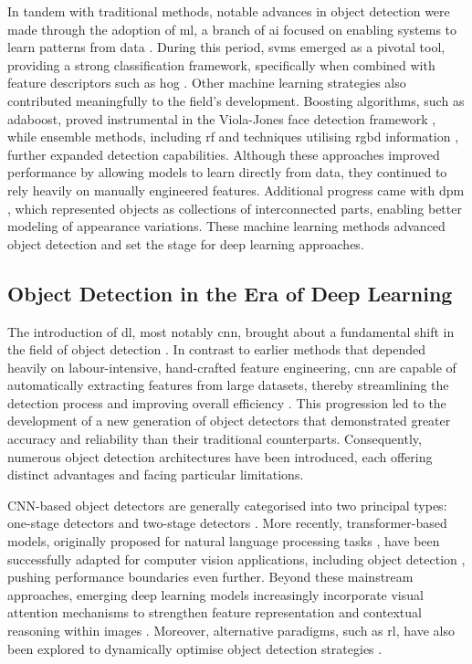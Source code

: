 In tandem with traditional methods, notable advances in object detection were made through the adoption of \gls{ml}, a branch of \gls{ai} focused on enabling systems to learn patterns from data \cite{machine_learning}. During this period, \gls{svms} \cite{hearst1998support} emerged as a pivotal tool, providing a strong classification framework, specifically when combined with feature descriptors such as \gls{hog} \cite{bhatt2023state}. Other machine learning strategies also contributed meaningfully to the field's development. Boosting algorithms, such as \gls{adaboost}, proved instrumental in the Viola-Jones face detection framework \cite{viola2001rapid}, while ensemble methods, including \gls{rf} \cite{saffari2009line} and techniques utilising \gls{rgbd} information \cite{seychell16}, further expanded detection capabilities. Although these approaches improved performance by allowing models to learn directly from data, they continued to rely heavily on manually engineered features. Additional progress came with \gls{dpm} \cite{felzenszwalb2009object}, which represented objects as collections of interconnected parts, enabling better modeling of appearance variations. These machine learning methods advanced object detection and set the stage for deep learning approaches.

\subsection{Object Detection in the Era of Deep Learning}
\label{subsec:2_detection_in_dl}

The introduction of \gls{dl}, most notably \gls{cnn}, brought about a fundamental shift in the field of object detection \cite{cnn_survey}. In contrast to earlier methods that depended heavily on labour-intensive, hand-crafted feature engineering, \gls{cnn} are capable of automatically extracting features from large datasets, thereby streamlining the detection process and improving overall efficiency \cite{feature_learning, deep_learning_review, cnns}. This progression led to the development of a new generation of object detectors that demonstrated greater accuracy and reliability than their traditional counterparts. Consequently, numerous object detection architectures have been introduced, each offering distinct advantages and facing particular limitations.

CNN-based object detectors are generally categorised into two principal types: one-stage detectors and two-stage detectors \cite{one_two_stage_detection}. More recently, transformer-based models, originally proposed for natural language processing tasks \cite{transformers}, have been successfully adapted for computer vision applications, including object detection \cite{detr, rt-detr}, pushing performance boundaries even further. Beyond these mainstream approaches, emerging deep learning models increasingly incorporate visual attention mechanisms to strengthen feature representation and contextual reasoning within images \cite{bartolo2024correlationobjectdetectionperformance, va_detection}. Moreover, alternative paradigms, such as \gls{rl}, have also been explored to dynamically optimise object detection strategies \cite{bartolo2024integratingsaliencyrankingreinforcement, Caicedo_2015_ICCV}.

